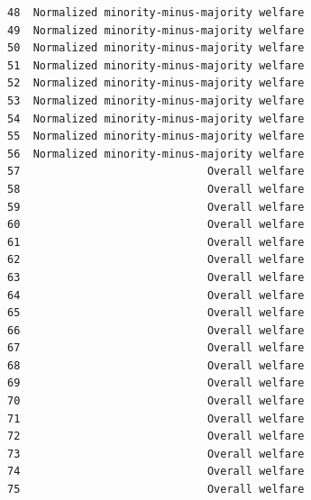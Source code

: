 \documentclass[11pt]{article}
\begin{document}
\begin{tcolorbox}[breakable, size=fbox, boxrule=.5pt, pad at break*=1mm, opacityfill=0]
\begin{Verbatim}[commandchars=\\\{\}]
48  Normalized minority-minus-majority welfare
49  Normalized minority-minus-majority welfare
50  Normalized minority-minus-majority welfare
51  Normalized minority-minus-majority welfare
52  Normalized minority-minus-majority welfare
53  Normalized minority-minus-majority welfare
54  Normalized minority-minus-majority welfare
55  Normalized minority-minus-majority welfare
56  Normalized minority-minus-majority welfare
57                             Overall welfare
58                             Overall welfare
59                             Overall welfare
60                             Overall welfare
61                             Overall welfare
62                             Overall welfare
63                             Overall welfare
64                             Overall welfare
65                             Overall welfare
66                             Overall welfare
67                             Overall welfare
68                             Overall welfare
69                             Overall welfare
70                             Overall welfare
71                             Overall welfare
72                             Overall welfare
73                             Overall welfare
74                             Overall welfare
75                             Overall welfare


\end{Verbatim}
\end{tcolorbox}
\end{document}
